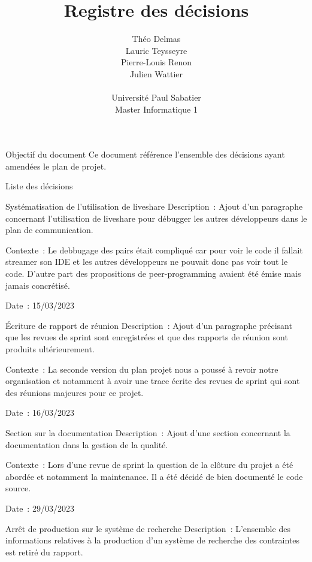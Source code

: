 \documentclass[]{article}
\title{Registre des décisions}
\author{
    Théo Delmas\\
    Lauric Teysseyre\\
    Pierre-Louis Renon\\
    Julien Wattier\\
    \\
    Université Paul Sabatier\\
    Master Informatique 1\\
   }
\begin{document}
\maketitle
\newpage
\tableofcontents
\newpage

\begin{section}{Objectif du document}
 Ce document référence l'ensemble des décisions ayant amendées le plan de projet.
\end{section}

{
\setlength{\parindent}{0pt} %
\begin{section}{Liste des décisions}
 \begin{subsection}{Systématisation de l’utilisation de liveshare}
     Description : Ajout d’un paragraphe concernant l’utilisation de liveshare pour débugger les autres développeurs dans le plan de communication.

     Contexte : Le debbugage des pairs était compliqué car pour voir le code il fallait streamer son IDE et les autres développeurs ne pouvait donc pas voir tout le code. D’autre part des propositions de peer-programming avaient été émise mais jamais concrétisé.

     Date : 15/03/2023
 \end{subsection}
 \begin{subsection}{Écriture de rapport de réunion}
     Description : Ajout d’un paragraphe précisant que les revues de sprint sont enregistrées et que des rapports de réunion sont produits ultérieurement.

     Contexte : La seconde version du plan projet nous a poussé à revoir notre organisation et notamment à avoir une trace écrite des revues de sprint qui sont des réunions majeures pour ce projet.

     Date : 16/03/2023
 \end{subsection}
 \begin{subsection}{Section sur la documentation}
     Description : Ajout d’une section concernant la documentation dans la gestion de la qualité.

     Contexte : Lors d’une revue de sprint la question de la clôture du projet a été abordée et notamment la maintenance. Il a été décidé de bien documenté le code source.

     Date : 29/03/2023
 \end{subsection}
 \begin{subsection}{Arrêt de production sur le système de recherche}
     Description : L’ensemble des informations relatives à la production d’un système de recherche des contraintes est retiré du rapport.


\end{subsection}
\end{section}}
\end{document}
